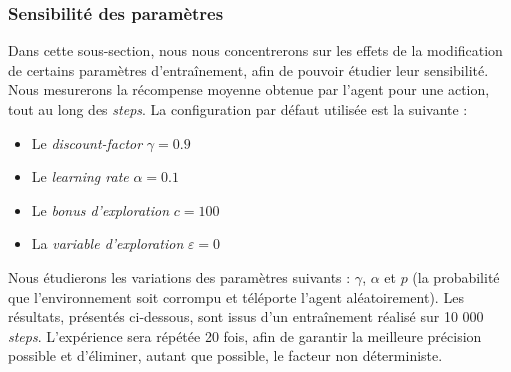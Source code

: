 \documentclass{article}
\begin{document}
\subsubsection{Sensibilité des paramètres}

\noindent Dans cette sous-section, nous nous concentrerons sur les effets de la modification de certains paramètres d'entraînement, afin de pouvoir étudier leur sensibilité. Nous mesurerons la récompense moyenne obtenue par l'agent pour une action, tout au long des \textit{steps}. La configuration par défaut utilisée est la suivante :

\begin{itemize}
    \item Le \textit{discount-factor} $\gamma = 0.9$
    \item Le \textit{learning rate} $\alpha = 0.1$
    \item Le \textit{bonus d'exploration} $c = 100$
    \item La \textit{variable d'exploration} $\varepsilon = 0$
\end{itemize}

\noindent Nous étudierons les variations des paramètres suivants : $\gamma$, $\alpha$ et $p$ (la probabilité que l'environnement soit corrompu et téléporte l'agent aléatoirement). Les résultats, présentés ci-dessous, sont issus d'un entraînement réalisé sur 10 000 \textit{steps}. L'expérience sera répétée 20 fois, afin de garantir la meilleure précision possible et d'éliminer, autant que possible, le facteur non déterministe.
\end{document}
